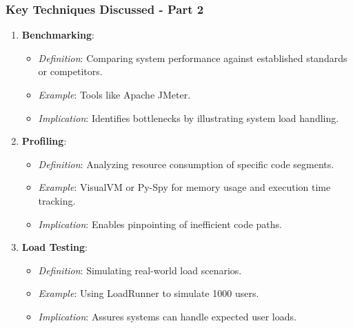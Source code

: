 \documentclass[aspectratio=169]{beamer}
\begin{document}
\begin{frame}[fragile]
  \frametitle{Key Techniques Discussed - Part 2}
  \begin{enumerate}
    \item \textbf{Benchmarking}:
      \begin{itemize}
        \item \textit{Definition}: Comparing system performance against established standards or competitors.
        \item \textit{Example}: Tools like Apache JMeter.
        \item \textit{Implication}: Identifies bottlenecks by illustrating system load handling.
      \end{itemize}
    \item \textbf{Profiling}:
      \begin{itemize}
        \item \textit{Definition}: Analyzing resource consumption of specific code segments.
        \item \textit{Example}: VisualVM or Py-Spy for memory usage and execution time tracking.
        \item \textit{Implication}: Enables pinpointing of inefficient code paths.
      \end{itemize}
    \item \textbf{Load Testing}:
      \begin{itemize}
        \item \textit{Definition}: Simulating real-world load scenarios.
        \item \textit{Example}: Using LoadRunner to simulate 1000 users.
        \item \textit{Implication}: Assures systems can handle expected user loads.
      \end{itemize}
  \end{enumerate}
\end{frame}
\end{document}
